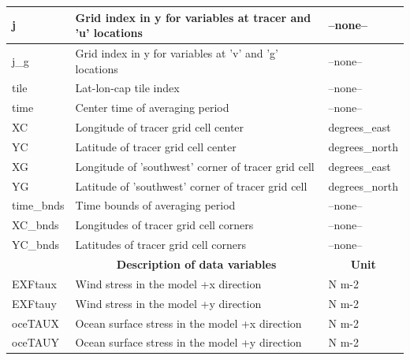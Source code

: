 \begin{longtable}{|m{}|m{}|m{}|}
j &Grid index in y for variables at tracer and 'u' locations &--none--  \\ \hline
j\_g &Grid index in y for variables at 'v' and 'g' locations &--none--  \\ \hline
tile &Lat-lon-cap tile index &--none--  \\ \hline
time &Center time of averaging period &--none--  \\ \hline
XC &Longitude of tracer grid cell center &degrees\_east  \\ \hline
YC &Latitude of tracer grid cell center &degrees\_north  \\ \hline
XG &Longitude of 'southwest' corner of tracer grid cell &degrees\_east  \\ \hline
YG &Latitude of 'southwest' corner of tracer grid cell &degrees\_north  \\ \hline
time\_bnds &Time bounds of averaging period &--none--  \\ \hline
XC\_bnds &Longitudes of tracer grid cell corners &--none--  \\ \hline
YC\_bnds &Latitudes of tracer grid cell corners &--none--  \\ \hline
\rowcolor{lightgray} \multicolumn{1}{|c|}{\textbf{Variables}} & \multicolumn{1}{|c|}{\textbf{Description of data variables}} &  \multicolumn{1}{|c|}{\textbf{Unit}}\\ \hline
EXFtaux &Wind stress in the model +x direction &N m-2  \\ \hline
EXFtauy &Wind stress in the model +y direction &N m-2  \\ \hline
oceTAUX &Ocean surface stress in the model +x direction &N m-2  \\ \hline
oceTAUY &Ocean surface stress in the model +y direction &N m-2  \\ \hline
\end{longtable}

\newp
\pagebreak
